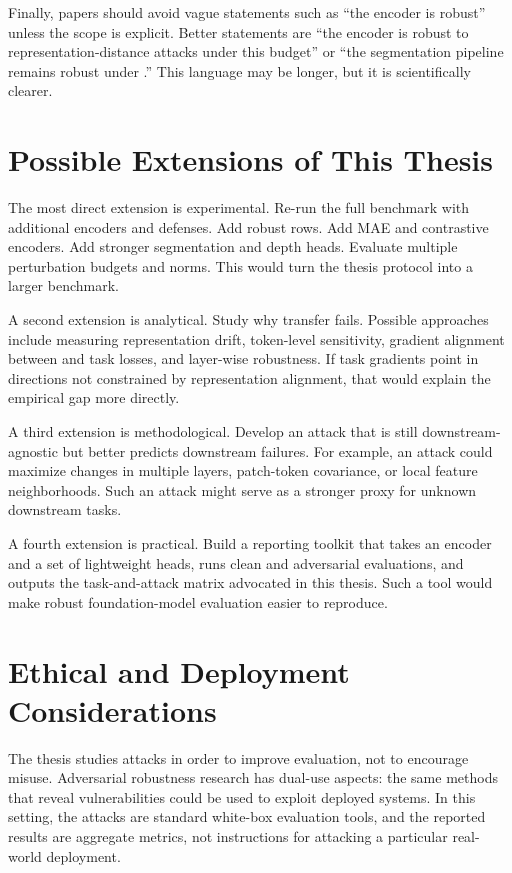 Finally, papers should avoid vague statements such as ``the encoder is robust'' unless the scope is explicit. Better statements are ``the encoder is robust to representation-distance attacks under this budget'' or ``the segmentation pipeline remains robust under \SegPGD.'' This language may be longer, but it is scientifically clearer.

\section{Possible Extensions of This Thesis}

The most direct extension is experimental. Re-run the full benchmark with additional encoders and defenses. Add robust \DINOv rows. Add MAE and contrastive encoders. Add stronger segmentation and depth heads. Evaluate multiple perturbation budgets and norms. This would turn the thesis protocol into a larger benchmark.

A second extension is analytical. Study why \DeACL transfer fails. Possible approaches include measuring representation drift, token-level sensitivity, gradient alignment between \EmbedAttack and task losses, and layer-wise robustness. If task gradients point in directions not constrained by representation alignment, that would explain the empirical gap more directly.

A third extension is methodological. Develop an attack that is still downstream-agnostic but better predicts downstream failures. For example, an attack could maximize changes in multiple layers, patch-token covariance, or local feature neighborhoods. Such an attack might serve as a stronger proxy for unknown downstream tasks.

A fourth extension is practical. Build a reporting toolkit that takes an encoder and a set of lightweight heads, runs clean and adversarial evaluations, and outputs the task-and-attack matrix advocated in this thesis. Such a tool would make robust foundation-model evaluation easier to reproduce.

\section{Ethical and Deployment Considerations}

The thesis studies attacks in order to improve evaluation, not to encourage misuse. Adversarial robustness research has dual-use aspects: the same methods that reveal vulnerabilities could be used to exploit deployed systems. In this setting, the attacks are standard white-box evaluation tools, and the reported results are aggregate metrics, not instructions for attacking a particular real-world deployment.

